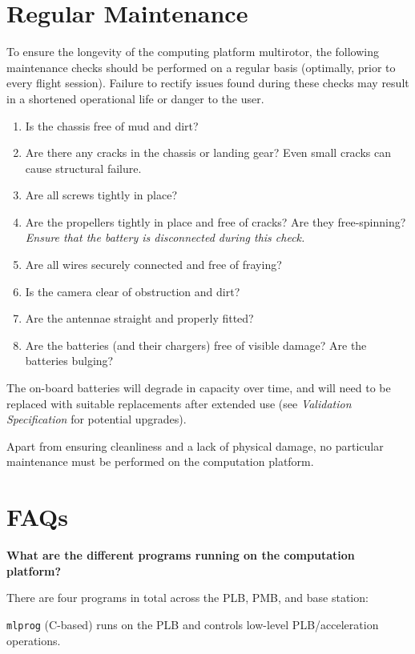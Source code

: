 \documentclass[10pt,letterpaper]{article}
\begin{document}
\section{Regular Maintenance}


To ensure the longevity of the computing platform multirotor, the following maintenance checks should be performed on a regular basis (optimally, prior to every flight session). Failure to rectify issues found during these checks may result in a shortened operational life or danger to the user.

\begin{enumerate}
\item Is the chassis free of mud and dirt?
\item Are there any cracks in the chassis or landing gear? Even small cracks can cause structural failure.
\item Are all screws tightly in place?
\item Are the propellers tightly in place and free of cracks? Are they free-spinning? \textit{Ensure that the battery is disconnected during this check.}
\item Are all wires securely connected and free of fraying?
\item Is the camera clear of obstruction and dirt?
\item Are the antennae straight and properly fitted?
\item Are the batteries (and their chargers) free of visible damage? Are the batteries bulging?
\end{enumerate}

The on-board batteries will degrade in capacity over time, and will need to be replaced with suitable replacements after extended use (see \textit{Validation Specification} for potential upgrades).

Apart from ensuring cleanliness and a lack of physical damage, no particular maintenance must be performed on the computation platform.

\section{FAQs}
\textbf{What are the different programs running on the computation platform?}

There are four programs in total across the PLB, PMB, and base station:

\texttt{mlprog} (C-based) runs on the PLB and controls low-level PLB/acceleration operations.
\end{document}
